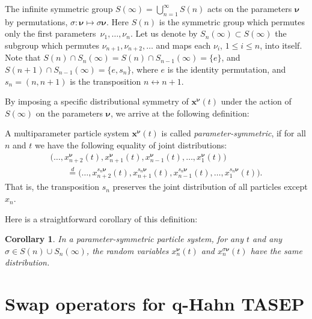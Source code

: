 \documentclass[11pt]{article}
\numberwithin{equation}{section}
\numberwithin{equation}{section}
\newtheorem{Corollary}[Theorem]{Corollary}
\begin{document}
The infinite symmetric group
$S(\infty)=\bigcup_{n=1}^{\infty}S(n)$
acts on the parameters ${\boldsymbol \nu}$ by permutations,
$\sigma\colon {\boldsymbol \nu}\mapsto \sigma{\boldsymbol \nu}$.
Here $S(n)$ is the symmetric group which permutes only the
first parame\-ters~$\nu_1,\ldots,\nu_n$.
Let us denote by $S_n(\infty)\subset S(\infty)$
the subgroup which permutes $\nu_{n+1},\nu_{n+2},\ldots $
and maps each $\nu_i$, $1\le i\le n$, into itself. Note that
$S(n)\cap S_n(\infty)=S(n)\cap S_{n-1}(\infty)=\{e\}$,
and~$S(n+1)\cap S_{n-1}(\infty)=\{e,s_{n}\}$,
where $e$ is the identity permutation, and
$s_{n}=(n,n+1)$ is the transposition
$n\leftrightarrow n+1$.

By imposing a specific distributional symmetry
of $\mathbf{x}^{{\boldsymbol \nu}}(t)$
under the action of $S(\infty)$
on the parameters ${\boldsymbol \nu}$, we arrive at the following definition:

\begin{Definition}
	\label{def:symm_IPS}
	A multiparameter particle system $\mathbf{x}^{{\boldsymbol \nu}}(t)$ is called \emph{parameter-symmetric},
	if for all $n$ and $t$ we have
	the following equality of joint distributions:
\begin{gather}
\big(\ldots,x_{n+2}^{{\boldsymbol \nu}}(t),x_{n+1}^{{\boldsymbol \nu}}(t),
x_{n-1}^{{\boldsymbol \nu}}(t),\ldots, x_1^{{\boldsymbol \nu}}(t)\big)\nonumber
\\ \qquad
{}\stackrel{d}{=}\big(\ldots,x_{n+2}^{s_n{\boldsymbol \nu}}(t),x_{n+1}^{s_n{\boldsymbol \nu}}(t),
x_{n-1}^{s_n{\boldsymbol \nu}}(t),\ldots,x_1^{s_n{\boldsymbol \nu}}(t)\big).
\label{eq:symm_IPS}
\end{gather}
	That is, the transposition $s_n$ preserves the joint
	distribution of all particles except $x_n$.
\end{Definition}
Here is a straightforward corollary of this definition:
\begin{Corollary}
	In a parameter-symmetric particle system,
	for any $t$ and any $\sigma\in S(n)\cup S_{n}(\infty)$, the
	random variables
	$x_n^{{\boldsymbol \nu}}(t)$ and
	$x_n^{\sigma {\boldsymbol \nu}}(t)$
	have the same distribution.
\end{Corollary}


\setcounter{section}{2}\setcounter{footnote}{3}\setcounter{figure}{2}
\section[Swap operators for q-Hahn TASEP]{Swap operators for $\boldsymbol q$-Hahn TASEP}\label{sec:qhahn_TASEP}
\end{document}
